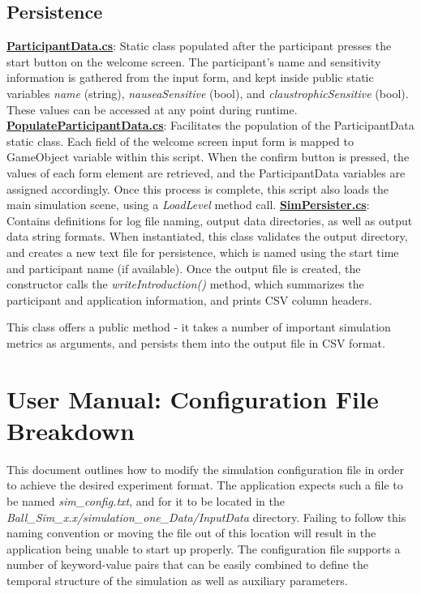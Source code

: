 \documentclass{article}
\begin{document}
\subsection{Persistence} %
\href{https://bit.ly/2Fhq8B2}{\textbf{ParticipantData.cs}}: Static class populated after the participant presses the start button on the welcome screen. The participant's name and sensitivity information is gathered from the input form, and kept inside public static variables \textit{name} (string), \textit{nauseaSensitive} (bool), and \textit{claustrophicSensitive} (bool). These values can be accessed at any point during runtime. \newline \newline
\href{https://bit.ly/2WgL6qR}{\textbf{PopulateParticipantData.cs}}: Facilitates the population of the ParticipantData static class. Each field of the welcome screen input form is mapped to GameObject variable within this script. When the confirm button is pressed, the values of each form element are retrieved, and the ParticipantData variables are assigned accordingly. Once this process is complete, this script also loads the main simulation scene, using a \textit{LoadLevel} method call. \newline \newline
\href{https://bit.ly/2OdbwH6}{\textbf{SimPersister.cs}}: Contains definitions for log file naming, output data directories, as well as output data string formats. When instantiated, this class validates the output directory, and creates a new text file for persistence, which is named using the start time and participant name (if available). Once the output file is created, the constructor calls the \textit{writeIntroduction()} method, which summarizes the participant and application information, and prints CSV column headers.

This class offers a public method  - it takes a number of important simulation metrics as arguments, and persists them into the output file in CSV format.







\section{User Manual: Configuration File Breakdown}
This document outlines how to modify the simulation configuration file in order to achieve the desired experiment format. The application expects such a file to be named \textit{sim\_config.txt}, and for it to be located in the \textit{Ball\_Sim\_x.x\slash simulation\_one\_Data\slash InputData} directory. Failing to follow this naming convention or moving the file out of this location will result in the application being unable to start up properly. The configuration file supports a number of keyword-value pairs that can be easily combined to define the temporal structure of the simulation as well as auxiliary parameters. 
\end{document}

